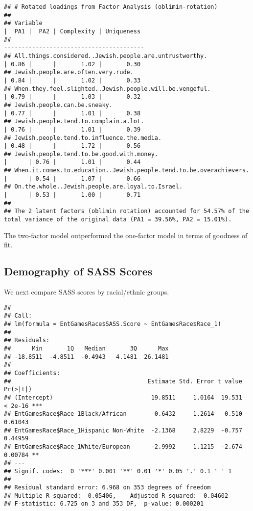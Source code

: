 \documentclass[
  doc,draftall]{apa6}
\begin{document}
\begin{verbatim}
## # Rotated loadings from Factor Analysis (oblimin-rotation)
## 
## Variable                                                            |  PA1 |  PA2 | Complexity | Uniqueness
## -----------------------------------------------------------------------------------------------------------
## All.things.considered..Jewish.people.are.untrustworthy.             | 0.86 |      |       1.02 |       0.30
## Jewish.people.are.often.very.rude.                                  | 0.84 |      |       1.02 |       0.33
## When.they.feel.slighted..Jewish.people.will.be.vengeful.            | 0.79 |      |       1.03 |       0.32
## Jewish.people.can.be.sneaky.                                        | 0.77 |      |       1.01 |       0.38
## Jewish.people.tend.to.complain.a.lot.                               | 0.76 |      |       1.01 |       0.39
## Jewish.people.tend.to.influence.the.media.                          | 0.48 |      |       1.72 |       0.56
## Jewish.people.tend.to.be.good.with.money.                           |      | 0.76 |       1.01 |       0.44
## When.it.comes.to.education..Jewish.people.tend.to.be.overachievers. |      | 0.54 |       1.07 |       0.66
## On.the.whole..Jewish.people.are.loyal.to.Israel.                    |      | 0.53 |       1.00 |       0.71
## 
## The 2 latent factors (oblimin rotation) accounted for 54.57% of the total variance of the original data (PA1 = 39.56%, PA2 = 15.01%).
\end{verbatim}

The two-factor model outperformed the one-factor model in terms of goodness of fit.

\subsection{Demography of SASS Scores}\label{demography-of-sass-scores}

We next compare SASS scores by racial/ethnic groups.

\begin{verbatim}
## 
## Call:
## lm(formula = EntGamesRace$SASS.Score ~ EntGamesRace$Race_1)
## 
## Residuals:
##      Min       1Q   Median       3Q      Max 
## -18.8511  -4.8511  -0.4943   4.1481  26.1481 
## 
## Coefficients:
##                                       Estimate Std. Error t value Pr(>|t|)    
## (Intercept)                            19.8511     1.0164  19.531  < 2e-16 ***
## EntGamesRace$Race_1Black/African        0.6432     1.2614   0.510  0.61043    
## EntGamesRace$Race_1Hispanic Non-White  -2.1368     2.8229  -0.757  0.44959    
## EntGamesRace$Race_1White/European      -2.9992     1.1215  -2.674  0.00784 ** 
## ---
## Signif. codes:  0 '***' 0.001 '**' 0.01 '*' 0.05 '.' 0.1 ' ' 1
## 
## Residual standard error: 6.968 on 353 degrees of freedom
## Multiple R-squared:  0.05406,    Adjusted R-squared:  0.04602 
## F-statistic: 6.725 on 3 and 353 DF,  p-value: 0.000201
\end{verbatim}
\end{document}
